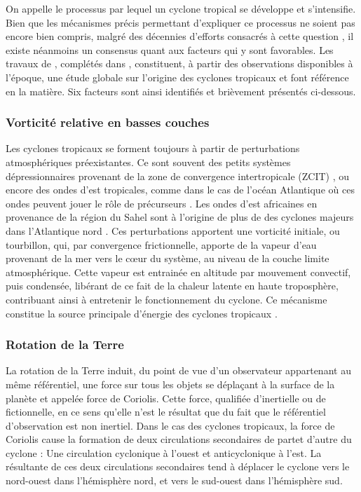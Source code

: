\documentclass[../main.tex]{subfiles}
\begin{document}
On appelle  le processus par lequel un cyclone tropical se développe et s'intensifie. Bien que les mécanismes précis permettant
d'expliquer ce processus ne soient pas encore bien compris, malgré des décennies d'efforts consacrés à cette question \parencite{yanai_formation_1964, gray_global_1968, 
montgomery_tropical_1993, gray_formation_1998, tory_tropical_2010}, il existe néanmoins un consensus quant aux facteurs qui y sont favorables. Les travaux de
\cite{gray_global_1968}, complétés dans \cite{gray_tropical_1975}, constituent, à partir des observations disponibles à l'époque, une étude globale sur
l'origine des cyclones tropicaux et font référence en la matière. Six facteurs sont ainsi identifiés et brièvement présentés ci-dessous.

\subsubsection*{Vorticité relative en basses couches}

Les cyclones tropicaux se forment toujours à partir de perturbations atmosphériques préexistantes. Ce sont souvent des petits systèmes dépressionnaires
provenant de la zone de convergence intertropicale (ZCIT) \parencite{gray_global_1968}, ou encore des ondes d'est tropicales, comme dans le cas de l'océan
Atlantique où ces ondes peuvent jouer le rôle de précurseurs \parencite{thorncroft_african_2001,patricola_response_2018}. Les ondes d'est africaines en provenance
de la région du Sahel sont à l'origine de plus de  des cyclones majeurs dans l'Atlantique nord \parencite{landsea_strong_1992}. Ces perturbations apportent
une vorticité initiale, ou tourbillon, qui, par convergence frictionnelle, apporte de la vapeur d'eau provenant de la mer vers le cœur du système, au niveau de la
couche limite atmosphérique. Cette vapeur est entrainée en altitude par mouvement convectif, puis condensée, libérant de ce fait de la chaleur latente en haute
troposphère, contribuant ainsi à entretenir le fonctionnement du cyclone. Ce mécanisme constitue la source principale d'énergie des cyclones tropicaux
\parencite{emanuel_dependence_1987}.

\subsubsection*{Rotation de la Terre}

La rotation de la Terre induit, du point de vue d'un observateur appartenant au même référentiel, une force sur tous les objets se déplaçant à la surface de la
planète et appelée force de Coriolis. Cette force, qualifiée d'inertielle ou de fictionnelle, en ce sens qu'elle n'est le résultat que du fait que le
référentiel d'observation est non inertiel. Dans le cas des cyclones tropicaux, la force de Coriolis cause la formation de deux circulations secondaires de
partet d'autre du cyclone : Une circulation cyclonique à l'ouest et anticyclonique à l'est. La résultante de ces deux circulations secondaires tend à déplacer
le cyclone vers le nord-ouest dans l'hémisphère nord, et vers le sud-ouest dans l'hémisphère sud.
\end{document}
